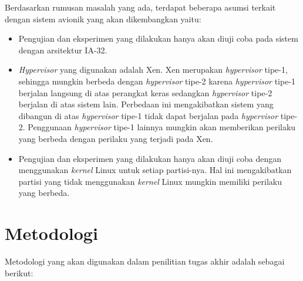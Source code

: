 Berdasarkan rumusan masalah yang ada, terdapat beberapa asumsi terkait dengan sistem avionik yang akan dikembangkan yaitu:

\begin{itemize}

    \item Pengujian dan eksperimen yang dilakukan hanya akan diuji coba pada sistem dengan arsitektur IA-32.
    \item \textit{Hypervisor} yang digunakan adalah Xen.  Xen merupakan \textit{hypervisor} tipe-1, sehingga mungkin berbeda dengan \textit{hypervisor} tipe-2 karena \textit{hypervisor} tipe-1 berjalan langsung di atas perangkat keras sedangkan \textit{hypervisor} tipe-2 berjalan di atas sistem lain.
        Perbedaan ini mengakibatkan sistem yang dibangun di atas \textit{hypervisor} tipe-1 tidak dapat berjalan pada \textit{hypervisor} tipe-2.
        Penggunaan \textit{hypervisor} tipe-1 lainnya mungkin akan memberikan perilaku yang berbeda dengan perilaku yang terjadi pada Xen.
    \item Pengujian dan eksperimen yang dilakukan hanya akan diuji coba dengan menggunakan \textit{kernel} Linux untuk setiap partisi-nya.
        Hal ini mengakibatkan partisi yang tidak menggunakan \textit{kernel} Linux mungkin memiliki perilaku yang berbeda.

\end{itemize}

\section{Metodologi}

Metodologi yang akan digunakan dalam penilitian tugas akhir adalah sebagai berikut:

